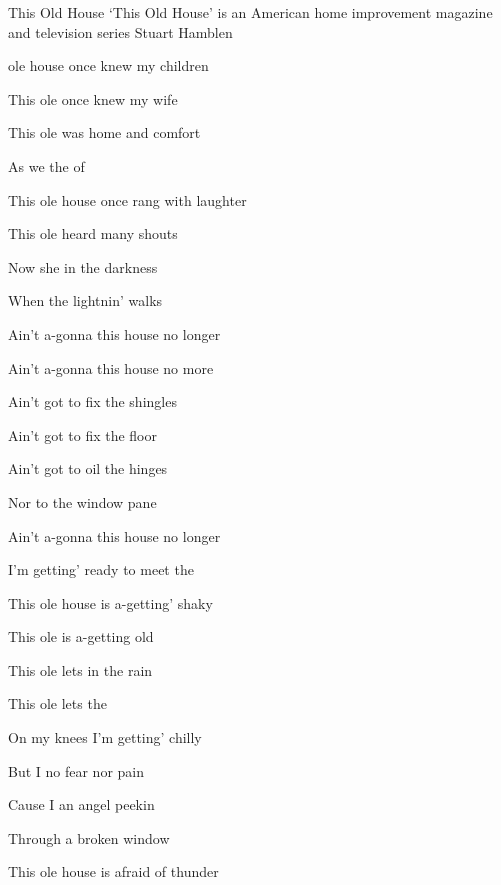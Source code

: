 \begin{SBSong}{This Old House}
  {`This Old House' is an American home improvement magazine and television series}
  {Stuart Hamblen}
  \begin{SBVerse}
	 ole house once knew my children
	
	This ole  once knew my wife
	
	This ole  was home and comfort
	
	As we  the  of 
	
	This ole house once rang with laughter
	
	This ole  heard many shouts
	
	Now she  in the darkness
	
	When the lightnin' walks 
  \end{SBVerse}
  \begin{SBChorus}
    Ain't a-gonna  this house no longer
	
	Ain't a-gonna  this house no more
	
	Ain't got  to fix the shingles
	
	Ain't got  to fix the floor
	
	Ain't got  to oil the hinges
	
	Nor to  the window pane
	
	Ain't a-gonna  this house no longer
	
	I'm getting' ready to meet the 
  \end{SBChorus}
  \begin{SBVerse}
    This ole house is a-getting' shaky
	
	This ole  is a-getting old
	
	This ole  lets in the rain
	
	This ole  lets  the 
	
	On my knees I'm getting' chilly
	
	But I  no fear nor pain
	
	Cause I  an angel peekin
	
	Through a broken window 
  \end{SBVerse}
  \CBPageBrk
  \begin{SBVerse}
    This ole house is afraid of thunder
	

\end{SBVerse}
\end{SBSong}

